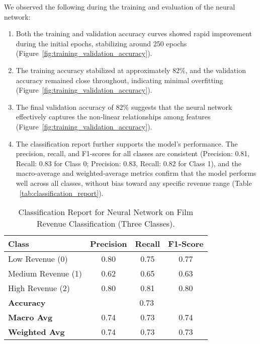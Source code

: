 \documentclass{article}
\begin{document}
We observed the following during the training and evaluation of the neural network:

\begin{enumerate}
    \item Both the training and validation accuracy curves showed rapid improvement during the initial epochs, stabilizing around 250 epochs (Figure~\ref{fig:training_validation_accuracy}).
    \item The training accuracy stabilized at approximately 82\%, and the validation accuracy remained close throughout, indicating minimal overfitting (Figure~\ref{fig:training_validation_accuracy}).
    \item The final validation accuracy of 82\% suggests that the neural network effectively captures the non-linear relationships among features (Figure~\ref{fig:training_validation_accuracy}).
    \item The classification report further supports the model's performance. The precision, recall, and F1-scores for all classes are consistent (Precision: 0.81, Recall: 0.83 for Class 0; Precision: 0.83, Recall: 0.82 for Class 1), and the macro-average and weighted-average metrics confirm that the model performs well across all classes, without bias toward any specific revenue range (Table ~\ref{tab:classification_report}).
\end{enumerate}

\begin{table}[H]
    \centering
    \small %
    \caption{Classification Report for Neural Network on Film Revenue Classification (Three Classes).}
    \label{tab:classification_report_three_classes}
    \vspace{0.1in} %
    \begin{tabular}{lccc}
        \toprule
        \textbf{Class} & \textbf{Precision} & \textbf{Recall} & \textbf{F1-Score} \\
        \midrule
        Low Revenue (0)  & 0.80 & 0.75 & 0.77 \\
        Medium Revenue (1) & 0.62 & 0.65 & 0.63 \\
        High Revenue (2) & 0.80 & 0.81 & 0.80 \\
        \midrule
        \textbf{Accuracy}  & \multicolumn{3}{c}{0.73} \\
        \textbf{Macro Avg} & 0.74 & 0.73 & 0.74 \\
        \textbf{Weighted Avg} & 0.74 & 0.73 & 0.73 \\
        \bottomrule
    \end{tabular}
    \vspace{0.1in} %
\end{table}
\end{document}
